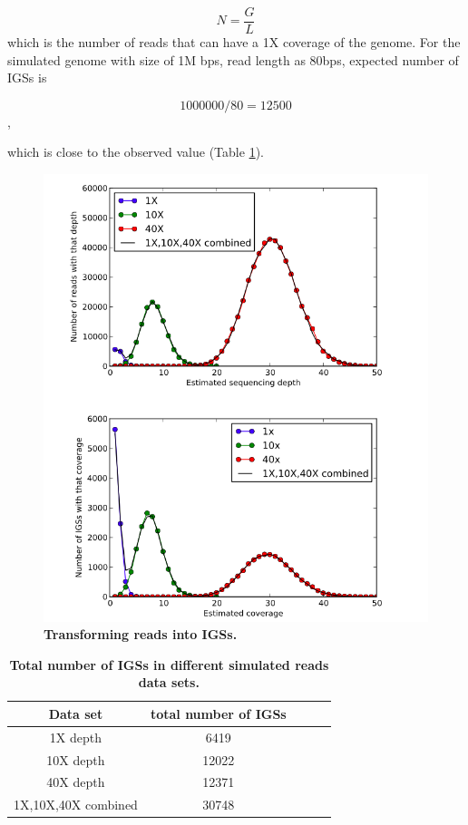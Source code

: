 \documentclass{article}
\begin{document}
\[N =\frac{G}{L} \]
which is the number of reads that can have a 1X coverage of the genome.
For the simulated genome with size of 1M bps, read length as 80bps, expected 
number of IGSs is 

\[1000000/80 = 12500 \], 

which is close to the observed value (Table \ref{table:IGSs}).


\begin{figure}[!ht]
\centerline{\includegraphics[width=6in]{./figures/from_reads_to_IGS.png}}
\caption{\bf Transforming reads into IGSs.}
\label{fig:reads_to_IGS}
\end{figure}





\begin{table}[!ht]
\centering
\begin{tabular}{ |c | c |c| c|c| }
\hline 
Data set & total number of IGSs \\
\hline 
1X depth                   & 6419  \\
10X depth                  & 12022  \\
40X depth                  & 12371 \\
1X,10X,40X combined        & 30748 \\
\hline 
\end{tabular}
\caption{
\bf{Total number of IGSs in different simulated reads data sets.}
}
\label{table:IGSs}
\end{table}
\end{document}
